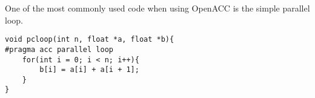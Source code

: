 One of the most commonly used code when using OpenACC is the simple parallel loop. 

\begin{Code}
\begin{lstlisting}[frame=single, caption=parallelLoop.c, label=prototype, numbers=none]
void pcloop(int n, float *a, float *b){
#pragma acc parallel loop
    for(int i = 0; i < n; i++){
        b[i] = a[i] + a[i + 1];
    }
}
\end{lstlisting}
\end{Code}
